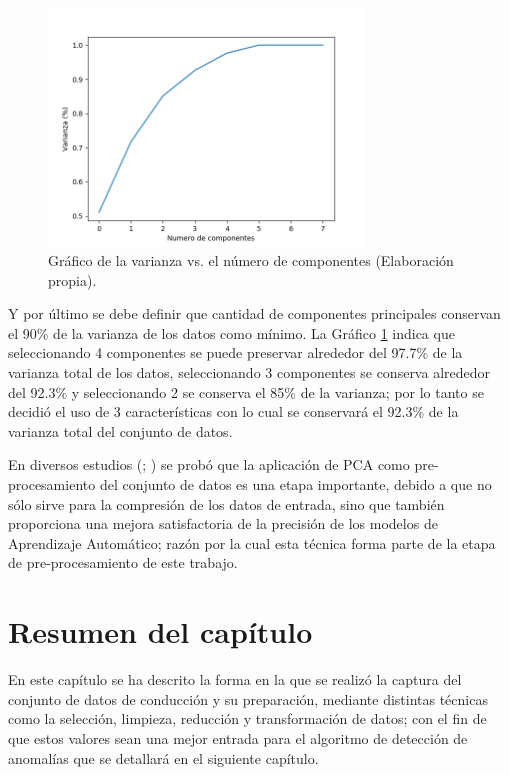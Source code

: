 \begin{figure}[h!]
  \begin{center}	\includegraphics[width=0.75\textwidth,frame]{imagenes/Cap3/pca}
  \caption{Gr\'{a}fico de la varianza vs. el n\'{u}mero de componentes (Elaboraci\'{o}n propia).}
  \label{fig:varianza-pca}
  \end{center}
\end{figure}

\vspace{5mm} %

Y por \'{u}ltimo se debe definir que cantidad de componentes principales conservan el 90\% de la varianza de los datos como m\'{i}nimo. La Gr\'{a}fico \ref{fig:varianza-pca} indica que seleccionando 4 componentes se puede preservar alrededor del 97.7\% de la varianza total de los datos, seleccionando 3 componentes se conserva alrededor del 92.3\% y seleccionando 2 se conserva el 85\% de la varianza; por lo tanto se decidi\'{o} el uso de 3 caracter\'{i}sticas con lo cual se conservar\'{a} el 92.3\% de la varianza total del conjunto de datos.

\vspace{5mm} %

En diversos estudios (; ) se prob\'{o} que la aplicaci\'{o}n de PCA como pre-procesamiento del conjunto de datos es una etapa importante, debido a que no s\'{o}lo sirve para la compresi\'{o}n de los datos de entrada, sino que tambi\'{e}n proporciona una mejora satisfactoria de la precisi\'{o}n de los modelos de Aprendizaje Autom\'{a}tico; raz\'{o}n por la cual esta t\'{e}cnica forma parte de la etapa de pre-procesamiento de este trabajo.

\section{Resumen del cap\'{i}tulo}

En este cap\'{i}tulo se ha descrito la forma en la que se realiz\'{o} la captura del conjunto de datos de conducci\'{o}n y su preparaci\'{o}n, mediante distintas t\'{e}cnicas como la selecci\'{o}n, limpieza, reducci\'{o}n y transformaci\'{o}n de datos; con el fin de que estos valores sean una mejor entrada para el algoritmo de detecci\'{o}n de anomal\'{i}as que se detallar\'{a} en el siguiente cap\'{i}tulo.